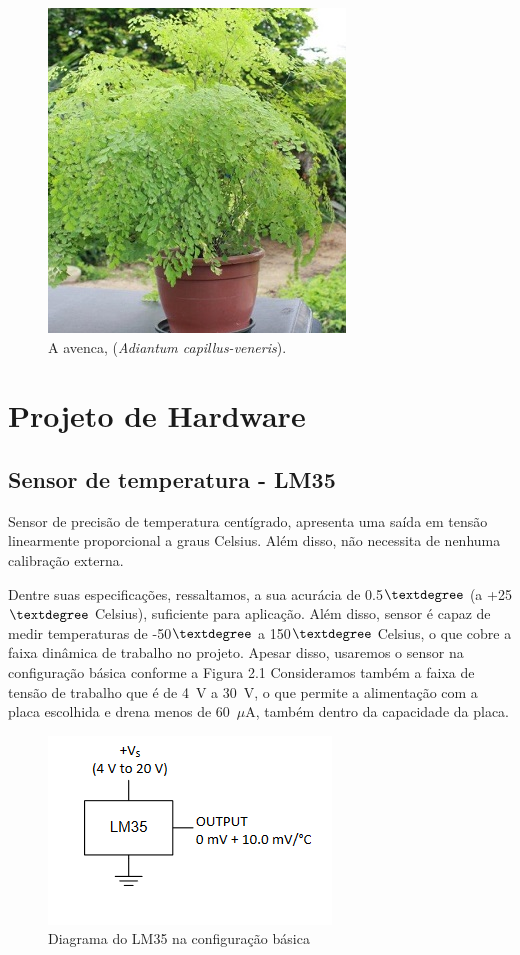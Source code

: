 \documentclass[a4paper,12pt]{report}
\begin{document}
	 
\begin{figure}[!h]
	\centering
	\includegraphics[width=0.4\linewidth]{figs/avenca}
	\caption{A avenca, (\textit{Adiantum capillus-veneris}).}
	\label{fig:avenca}
\end{figure}
	
	\section{Projeto de Hardware}
	
		\subsection{Sensor de temperatura - LM35}
		
		Sensor de precisão de temperatura centígrado, apresenta uma saída em tensão linearmente proporcional a graus Celsius. Além disso, não necessita de nenhuma calibração externa.
		
		Dentre suas especificações, ressaltamos, a sua acurácia de 0.5$\textdegree$ (a +25$\textdegree$ Celsius), suficiente para aplicação. Além disso, sensor é capaz de medir temperaturas de -50$\textdegree$ a 150$\textdegree$ Celsius, o que cobre a faixa dinâmica de trabalho no projeto. Apesar disso, usaremos o sensor na configuração básica conforme a Figura 2.1 Consideramos também a faixa de tensão de trabalho que é de 4~V a 30~V, o que permite a alimentação com a placa escolhida e drena menos de 60~$\mu$A, também dentro da capacidade da placa.
		\begin{figure}[!htb]
			\centering
			\includegraphics{LM35_config_basica}
			\caption{Diagrama do LM35 na configuração básica}
			\label{Rotulo}
		\end{figure}
\end{document}
